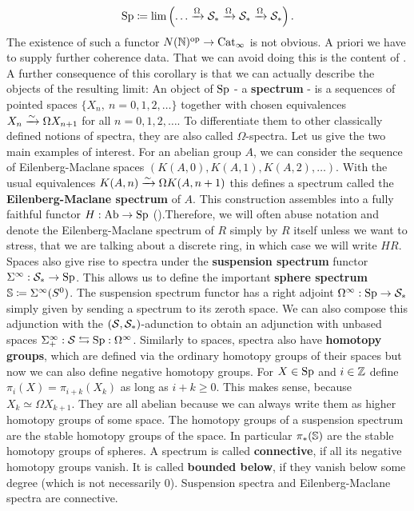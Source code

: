 \begin{equation*}
    \Sp\coloneqq \lim\left( \dots\xrightarrow{\Omega}\Spc_* \xrightarrow{\Omega} \Spc_* \xrightarrow{\Omega}\Spc_* \right).
\end{equation*}
The existence of such a functor $N(\N)^{\op}\ra \Cat_\infty$ is not obvious. 
A priori we have to supply further coherence data. That we can avoid doing this is the content of \cite[Corollary~7.3.17]{cisinski2019higher}. A further consequence of this corollary is that we can actually describe the objects of the resulting limit:
An object of $\Sp$ - a \textbf{spectrum} -  is a sequences of pointed spaces $\{X_n,\ n=0,1,2,\dots\}$ together with chosen equivalences $X_n\rai \Omega X_{n+1}$ for all $n=0,1,2,\dots$. To differentiate them to other classically defined notions of spectra, they are also called $\Omega$-spectra.
Let us give the two main examples of interest. For an abelian group $A$, we can consider the sequence of Eilenberg-Maclane spaces $\left( K(A,0), K(A,1), K(A,2),\dots \right)$. With the usual equivalences $K(A,n)\rai \Omega K(A,n+1)$ this defines a spectrum called the \textbf{Eilenberg-Maclane spectrum }of $A$. 
This construction assembles into a fully faithful functor $H:\Ab\ra \Sp$ (\cite[Example~1.3.3.5]{lurie2017higher}).Therefore, we will often abuse notation and denote the Eilenberg-Maclane spectrum of $R$ simply by $R$ itself unless we want to stress, that we are talking about a discrete ring, in which case we will write $HR$. Spaces also give rise to spectra under the \textbf{suspension spectrum} functor $\Sigma^{\infty}:\Spc_*\ra \Sp$. 
This allows us to define the important \textbf{sphere spectrum} $\S\coloneqq \Sigma^{\infty}(S^0)$. The suspension spectrum functor has a right adjoint $\Omega^\infty:\Sp\to\Spc_*$ simply given by sending a spectrum to its zeroth space. We can also compose this adjunction with the $(\Spc,\Spc_*)$-adunction to obtain an adjunction with unbased spaces $\sip:\Spc\leftrightarrows\Sp:\Omega^\infty$.
Similarly to spaces, spectra also have \textbf{homotopy groups}, which are defined via the ordinary homotopy groups of their spaces but now we can also define negative homotopy groups. For $X\in \Sp$ and $i\in\Z$ define $\pi_i(X)=\pi_{i+k}(X_k)$ as long as $i+k\geq 0$. This makes sense, because $X_k\simeq \Omega X_{k+1}$. They are all abelian because we can always write them as higher homotopy groups of some space.
The homotopy groups of a suspension spectrum are the stable homotopy groups of the space. In particular $\pi_*(\S)$ are the stable homotopy groups of spheres. A spectrum is called \textbf{connective}, if all its negative homotopy groups vanish. It is called \textbf{bounded below}, if they vanish below some degree (which is not necessarily 0). Suspension spectra and Eilenberg-Maclane spectra are connective.
